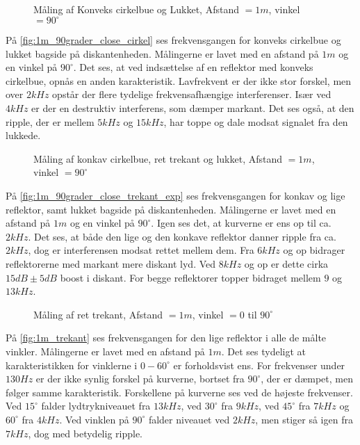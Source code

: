 \begin{figure}[H]
    \caption{Måling af Konveks cirkelbue og Lukket, Afstand $= 1m$, vinkel $= 90 ^{\circ}$ }
    \label{fig:1m_90grader_close_cirkel}
\end{figure} 

På \autoref{fig:1m_90grader_close_cirkel} ses frekvensgangen for konveks cirkelbue og lukket bagside på diskantenheden.
Målingerne er lavet med en afstand på $1m$ og en vinkel på $90 ^{\circ}$.
Det ses, at ved indsættelse af en reflektor med konveks cirkelbue, opnås en anden karakteristik. 
Lavfrekvent er der ikke stor forskel, men over $2 kHz$ opstår der flere tydelige frekvensafhængige interferenser.
Især ved $4 kHz$ er der en destruktiv interferens, som dæmper markant. 
Det ses også, at den ripple, der er mellem $5kHz$ og $15kHz$, har toppe og dale modsat signalet fra den lukkede. 

\begin{figure}[H]
    \caption{Måling af konkav cirkelbue, ret trekant og lukket, Afstand $= 1m$, vinkel $= 90 ^{\circ}$ }
    \label{fig:1m_90grader_close_trekant_exp}
\end{figure} 

På \autoref{fig:1m_90grader_close_trekant_exp} ses frekvensgangen for konkav og lige reflektor, samt lukket bagside på diskantenheden.
Målingerne er lavet med en afstand på $1m$ og en vinkel på $90 ^{\circ}$.
Igen ses det, at kurverne er ens op til ca. $2 kHz$.
Det ses, at både den lige og den konkave reflektor danner ripple fra ca. $2 kHz$, dog er interferensen modsat rettet mellem dem. 
Fra $6 kHz$ og op bidrager reflektorerne med markant mere diskant lyd. Ved $8 kHz$ og op er dette cirka $15dB \pm5dB$ boost i diskant.
For begge reflektorer topper bidraget  mellem $9 $ og $ 13 kHz$.

\begin{figure}[H]
    \caption{Måling af ret trekant, Afstand $= 1m$, vinkel $= 0 $ til $90 ^{\circ}$ }
    \label{fig:1m_trekant}
\end{figure} 

På \autoref{fig:1m_trekant} ses frekvensgangen for den lige reflektor i alle de målte vinkler.
Målingerne er lavet med en afstand på $1m$. 
Det ses tydeligt at karakteristikken for vinklerne i $0 - 60^{\circ}$ er forholdsvist ens.
For frekvenser under $130 Hz$ er der ikke synlig forskel på kurverne, bortset fra $90 ^{\circ}$, der er dæmpet, men følger samme karakteristik. 
Forskellene på kurverne ses ved de højeste frekvenser. 
Ved $15 ^{\circ}$ falder lydtrykniveauet fra $13 kHz$, ved $30 ^{\circ}$ fra $9 kHz$, ved $45 ^{\circ}$ fra $7 kHz$ og $60 ^{\circ}$ fra $4 kHz$.
Ved vinklen på $ 90 ^{\circ}$ falder niveauet ved $2 kHz$, men stiger så igen fra $7 kHz$, dog med betydelig ripple. 

